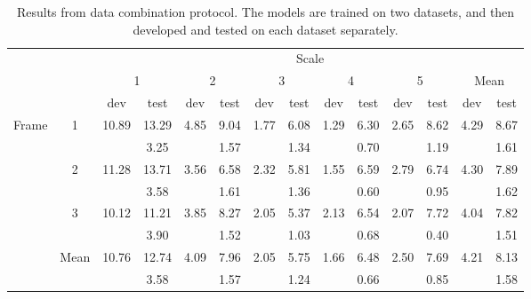 \documentclass[letterpaper, 10 pt, conference]{ieeeconf}
\begin{document}
\begin{table*}[!htb]
\caption{Results from data combination protocol. The models are trained on two datasets, and then developed and tested on each dataset separately.}
\label{TB_COMBINED_OURS}
\centering
\begin{tabular}{|c|c|c|c|c|c|c|c|c|c|c|c||c|c|}
\cline{3-14}
\multicolumn{2}{c|}{}       & \multicolumn{12}{c|}{Scale}     \\
\cline{3-14}
\multicolumn{2}{c|}{} & \multicolumn{2}{c|}{1} & \multicolumn{2}{c|}{2} & \multicolumn{2}{c|}{3} & \multicolumn{2}{c|}{4} & \multicolumn{2}{c|}{5} &  \multicolumn{2}{c|}{Mean}\\
\cline{3-14}
\multicolumn{2}{c|}{} & dev & test & dev & test & dev & test & dev & test & dev & test & dev & test \\
\hline
\multirow{6}{*}{Frame} & \multirow{2}{*}{1} & \multirow{2}{*}{10.89} & 13.29 & \multirow{2}{*}{4.85} & 9.04 & \multirow{2}{*}{1.77} & 6.08 & \multirow{2}{*}{1.29} & 6.30 & \multirow{2}{*}{2.65} & 8.62 & \multirow{2}{*}{4.29} & 8.67 \\ 
                      &  &  & 3.25 & & 1.57 & & 1.34 & & 0.70 & & 1.19 & & 1.61 \\ 
\cline{2-14}                   
                      & \multirow{2}{*}{2} & \multirow{2}{*}{11.28} & 13.71 & \multirow{2}{*}{3.56} & 6.58 & \multirow{2}{*}{2.32} & 5.81 & \multirow{2}{*}{1.55} & 6.59 & \multirow{2}{*}{2.79} & 6.74 & \multirow{2}{*}{4.30} & 7.89 \\
                      &  &  & 3.58 & & 1.61 & & 1.36 & & 0.60 & & 0.95 & & 1.62 \\
\cline{2-14}                  
                       & \multirow{2}{*}{3} & \multirow{2}{*}{10.12} & 11.21 & \multirow{2}{*}{3.85} & 8.27 & \multirow{2}{*}{2.05} & 5.37 & \multirow{2}{*}{2.13} & 6.54 & \multirow{2}{*}{2.07} & 7.72 & \multirow{2}{*}{4.04} & 7.82 \\ 
                       &  &  & 3.90 &  & 1.52 &  & 1.03 &  & 0.68 &  & 0.40 & & 1.51 \\ 
\hline
\hline
& \multirow{2}{*}{Mean} & \multirow{2}{*}{10.76} & 12.74 & \multirow{2}{*}{4.09} & 7.96 & \multirow{2}{*}{2.05} & 5.75 & \multirow{2}{*}{1.66} & 6.48 & \multirow{2}{*}{2.50} & 7.69 & \multirow{2}{*}{4.21} & 8.13 \\
&  &  & 3.58 & & 1.57 & & 1.24 & & 0.66 & & 0.85 & & 1.58 \\
\hline
\end{tabular}
\end{table*}
\end{document}
